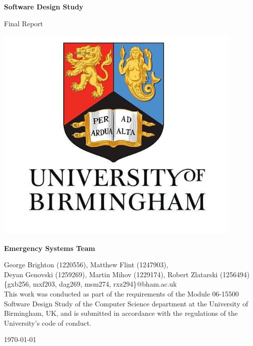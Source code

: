 \documentclass{article}
\begin{document}
    \begin{center}
        \LARGE
        \textbf{Software Design Study}

        \vspace{0.2cm}
        \large
        Final Report

        \vfill
        \includegraphics[width=0.9\textwidth]{university}

        \vfill

        \large
        \textbf{Emergency Systems Team}

        \vspace{0.3cm}
        \normalsize
        George Brighton (1220556), Matthew Flint (1247903),\\
        Deyan Genovski (1259269), Martin Mihov (1229174), Robert Zlatarski (1256494)\\
        \{gxb256, mxf203, dag269, msm274, rxz294\}@bham.ac.uk\\

        \vspace{0.5cm}
        This work was conducted as part of the requirements of the Module 06-15500 Software Design Study of the Computer Science department at the University of Birmingham, UK, and is submitted in accordance with the regulations of the University's code of conduct.

        \vspace{0.2cm}
        \today

    \end{center}
    \newpage
\end{document}
